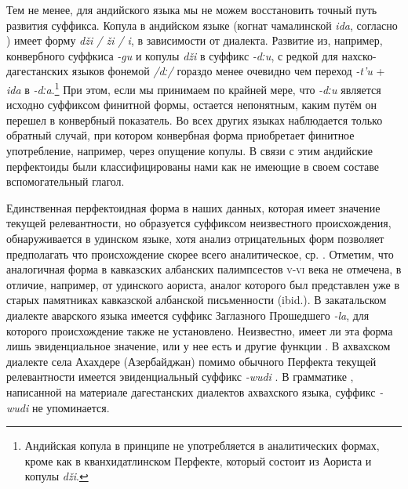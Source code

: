 \par Тем не менее, для андийского языка мы не можем восстановить точный путь развития суффикса. Копула в андийском языке (когнат чамалинской \textit{ida}, согласно \citep[57]{gudava1959}) имеет форму \textit{dži / ži / i}, в зависимости от диалекта. Развитие из, например, конвербного суффкиса \textit{-gu} и копулы \textit{dži} в суффикс \textit{-dːu}, с редкой для нахско-дагестанских языков фонемой \textit{/dː/} гораздо менее очевидно чем переход \textit{-t’u} + \textit{ida} в \textit{-dːa}.\footnote{Андийская копула в принципе не употребляется в аналитических формах, кроме как в кванхидатлинском Перфекте, который состоит из Аориста и копулы \textit{dži}.} При этом, если мы принимаем по крайней мере, что \textit{-dːu} является исходно суффиксом финитной формы, остается непонятным, каким путём он перешел в конвербный показатель. Во всех других языках наблюдается только обратный случай, при котором конвербная форма приобретает финитное употребление, например, через опущение копулы. В связи с этим андийские перфектоиды были классифицированы нами как не имеющие в своем составе вспомогательный глагол.
\par Единственная перфектоидная форма в наших данных, которая имеет значение текущей релевантности, но образуется суффиксом неизвестного происхождения, обнаруживается в удинском языке, хотя анализ отрицательных форм позволяет предполагать что происхождение скорее всего аналитическое, ср. \citep[158--160]{maisak2018}. Отметим, что аналогичная форма в кавказских албанских палимпсестов \textsc{v-vi} века не отмечена, в отличие, например, от удинского аориста, аналог которого был представлен уже в старых памятниках кавказской албанской письменности (ibid.). В закатальском диалекте аварского языка имеется суффикс Заглазного Прошедшего \textit{-la}, для которого происхождение также не установлено. Неизвестно, имеет ли эта форма лишь эвиденциальное значение, или у нее есть и другие функции \citep[143--144]{saidova2007}. В ахвахском диалекте села Ахахдере (Азербайджан) помимо обычного Перфекта текущей релевантности имеется эвиденциальный суффикс \textit{-wudi} \citep{creissels2018}. В грамматике \citep{magomedbekova1967}, написанной на материале дагестанских диалектов ахвахского языка, суффикс \textit{-wudi} не упоминается.
